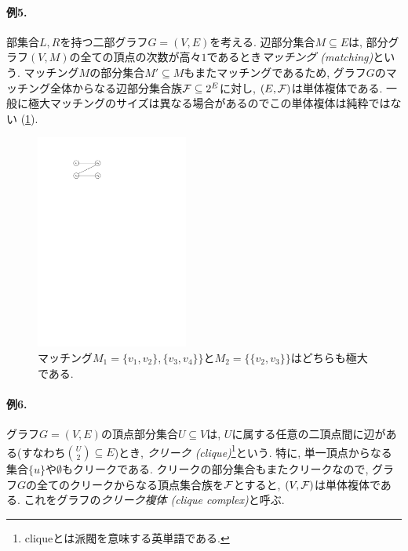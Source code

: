 \paragraph*{例5.}
部集合$L,R$を持つ二部グラフ$G=(V,E)$を考える.
辺部分集合$M\subseteq E$は, 部分グラフ$(V,M)$の全ての頂点の次数が高々$1$であるとき\emph{マッチング (matching)}という.
マッチング$M$の部分集合$M'\subseteq M$もまたマッチングであるため,
グラフ$G$のマッチング全体からなる辺部分集合族$\mathcal{F}\subseteq 2^E$に対し, $(E,\mathcal{F})$は単体複体である.
一般に極大マッチングのサイズは異なる場合があるのでこの単体複体は純粋ではない (\cref{fig:matching}).
\begin{figure}[htbp]
    \begin{center}
        \includegraphics[width=5cm]{images/matching.pdf}
    \end{center}
    \caption{マッチング$M_1=\{v_1,v_2\},\{v_3,v_4\}\}$と$M_2=\{\{v_2,v_3\}\}$はどちらも極大である. \label{fig:matching}}
\end{figure}

\paragraph*{例6.}
グラフ$G=(V,E)$の頂点部分集合$U\subseteq V$は, $U$に属する任意の二頂点間に辺がある(すなわち$\binom{U}{2}\subseteq E$)とき, \emph{クリーク (clique)}\footnote{cliqueとは派閥を意味する英単語である.}という.
特に, 単一頂点からなる集合$\{u\}$や$\emptyset$もクリークである.
クリークの部分集合もまたクリークなので,
グラフ$G$の全てのクリークからなる頂点集合族を$\mathcal{F}$とすると, $(V,\mathcal{F})$は単体複体である.
これをグラフの\emph{クリーク複体 (clique complex)}と呼ぶ.

